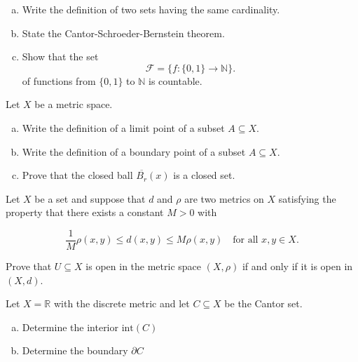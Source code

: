 \documentclass[11pt]{exam}
\theoremstyle{definition}
\begin{document}
\begin{questions}
\newpage
\question[10]\mbox{}
\begin{enumerate}[(a)]
\item  Write the definition of two sets having the same cardinality.
\vspace{1in}
\item  State the Cantor-Schroeder-Bernstein theorem.
\vspace{1in}
\item  Show that the set
$$\mathcal F = \{f: \{0,1\}\rightarrow\mathbb N\}.$$
of functions from $\{0,1\}$ to $\mathbb N$ is countable.
\end{enumerate}

\newpage
\question[10]
Let $X$ be a metric space.
\begin{enumerate}[(a)]
\item Write the definition of a limit point of a subset $A\subseteq X$.
\vspace{1in}
\item Write the definition of a boundary point of a subset $A\subseteq X$.
\vspace{1in}
\item Prove that the closed ball $\overline{B_r}(x)$ is a closed set.
\end{enumerate}

\newpage
\question[10]
Let $X$ be a set and suppose that $d$ and $\rho$ are two metrics on $X$ satisfying the property that there exists a constant $M>0$ with

$$\frac{1}{M}\rho(x,y)\leq d(x,y)\leq M\rho(x,y)\quad\text{for all }x,y\in X.$$

Prove that $U\subseteq X$ is open in the metric space $(X,\rho)$ if and only if it is open in $(X,d)$.

\newpage
\question[10]
Let $X = \mathbb R$ with the discrete metric and let $C\subseteq X$ be the Cantor set.
\begin{enumerate}[(a)]
\item  Determine the interior $\text{int}(C)$
\vspace{3in}
\item  Determine the boundary $\partial C$
\end{enumerate}


\end{questions}
\end{document}
